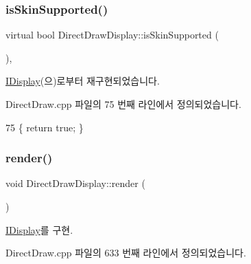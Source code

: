 \subsubsection{\texorpdfstring{is\+Skin\+Supported()}{isSkinSupported()}}
{\footnotesize\ttfamily virtual bool Direct\+Draw\+Display\+::is\+Skin\+Supported (\begin{DoxyParamCaption}{ }\end{DoxyParamCaption})\hspace{0.3cm}{\ttfamily [inline]}, {\ttfamily [virtual]}}



\mbox{\hyperlink{class_i_display_ad717007b624f0a8e7c830ab803cd8a92}{I\+Display}}(으)로부터 재구현되었습니다.



Direct\+Draw.\+cpp 파일의 75 번째 라인에서 정의되었습니다.


\begin{DoxyCode}
75 \{ \textcolor{keywordflow}{return} \textcolor{keyword}{true}; \}
\end{DoxyCode}
\mbox{\label{class_direct_draw_display_ab09489c28cb1fb5aaab0e51824fe3a28}} 
\subsubsection{\texorpdfstring{render()}{render()}}
{\footnotesize\ttfamily void Direct\+Draw\+Display\+::render (\begin{DoxyParamCaption}{ }\end{DoxyParamCaption})\hspace{0.3cm}{\ttfamily [virtual]}}



\mbox{\hyperlink{class_i_display_af61c440b97da313a502e86346a729b03}{I\+Display}}를 구현.



Direct\+Draw.\+cpp 파일의 633 번째 라인에서 정의되었습니다.



